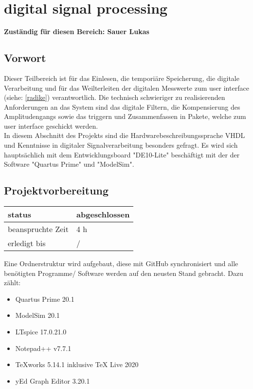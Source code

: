 \section{digital signal processing} \label{sauer}
\textbf{Zuständig für diesen Bereich: Sauer Lukas}\\
\subsection{Vorwort}
Dieser Teilbereich ist für das Einlesen, die temporiäre Speicherung, die digitale Verarbeitung und für das Weilterleiten der digitalen Messwerte zum user interface (siehe: \ref{radike}) verantwortlich. Die technisch schwieriger zu realisierenden Anforderungen an das System sind das digitale Filtern, die Kompensierung des Amplitudengangs sowie das triggern und Zusammenfassen in Pakete, welche zum user interface geschickt werden.\\
In diesem Abschnitt des Projekts sind die Hardwarebeschreibungssprache VHDL und Kenntnisse in digitaler Signalverarbeitung besonders gefragt. Es wird sich hauptsächlich mit dem Entwicklungsboard "DE10-Lite" beschäftigt mit der der Software "Quartus Prime" und "ModelSim".

\subsection{Projektvorbereitung}
\begin{tabular}[h]{|l|l|} %
	\hline
	status & abgeschlossen\\
	\hline
	beanspruchte Zeit & 4 h\\
	\hline
	erledigt bis & / \\
	\hline
\end{tabular}

Eine Ordnerstruktur wird aufgebaut, diese mit GitHub synchronisiert und alle benötigten Programme/ Software werden auf den neusten Stand gebracht.
Dazu zählt:
\begin{itemize}
\item Quartus Prime 20.1
\item ModelSim 20.1
\item LTspice 17.0.21.0
\item Notepad++ v7.7.1
\item TeXworks 5.14.1 inklusive TeX Live 2020
\item yEd Graph Editor 3.20.1
\end {itemize}

